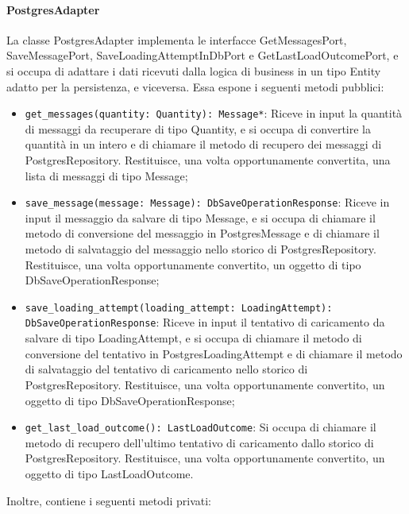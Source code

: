 \paragraph{PostgresAdapter}
\label{sec:postgres_adapter}
La classe PostgresAdapter implementa le interfacce GetMessagesPort, SaveMessagePort, SaveLoadingAttemptInDbPort e GetLastLoadOutcomePort, e si occupa di adattare i dati ricevuti dalla logica di business in un tipo Entity adatto per la persistenza, e viceversa. Essa espone i seguenti metodi pubblici:
\begin{itemize}
    \item \texttt{get\_messages(quantity: Quantity): Message*}: Riceve in input la quantità di messaggi da recuperare di tipo Quantity, e si occupa di convertire la quantità in un intero e di chiamare il metodo di recupero dei messaggi di PostgresRepository. Restituisce, una volta opportunamente convertita, una lista di messaggi di tipo Message;
    \item \texttt{save\_message(message: Message): DbSaveOperationResponse}: Riceve in input il messaggio da salvare di tipo Message, e si occupa di chiamare il metodo di conversione del messaggio in PostgresMessage e di chiamare il metodo di salvataggio del messaggio nello storico di PostgresRepository. Restituisce, una volta opportunamente convertito, un oggetto di tipo DbSaveOperationResponse;
    \item \texttt{save\_loading\_attempt(loading\_attempt: LoadingAttempt): DbSaveOperationResponse}: Riceve in input il tentativo di caricamento da salvare di tipo LoadingAttempt, e si occupa di chiamare il metodo di conversione del tentativo in PostgresLoadingAttempt e di chiamare il metodo di salvataggio del tentativo di caricamento nello storico di PostgresRepository. Restituisce, una volta opportunamente convertito, un oggetto di tipo DbSaveOperationResponse;
    \item \texttt{get\_last\_load\_outcome(): LastLoadOutcome}: Si occupa di chiamare il metodo di recupero dell'ultimo tentativo di caricamento dallo storico di PostgresRepository. Restituisce, una volta opportunamente convertito, un oggetto di tipo LastLoadOutcome.
\end{itemize}
Inoltre, contiene i seguenti metodi privati:
